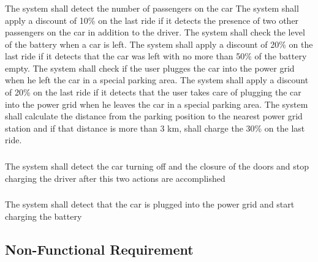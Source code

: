 \subsubsection{}
\begin{itemize}
	\reqcounter The system shall detect the number of passengers on the car
	\reqcounter The system shall apply a discount of 10\% on the last ride if it detects the presence of two other passengers on the car in addition to the driver.
	\reqcounter The system shall check the level of the battery when a car is left.
	\reqcounter The system shall apply a discount 	of 20\% on the last ride if it detects that the car was left with no more than 50\% of the battery empty.
	\reqcounter The system shall check if the user plugges the car into the power grid when he left the car in a special parking area.
	\reqcounter The system shall apply a discount 	of 20\% on the last ride if it detects that the user takes care of plugging the car into the power grid when he leaves the car in a special parking area. 
	\reqcounter The system shall calculate the distance from the parking position to the nearest power grid station and if that distance is more than 3 km, shall charge the 30\% on the last ride. 
		
\end{itemize}


\subsubsection{}
\begin{itemize}
	\reqcounter The system shall detect the car turning off and the closure of the doors and stop charging the driver after this two actions are accomplished
	
\end{itemize}


\subsubsection{}
\begin{itemize}
	\reqcounter The system shall detect that the car is plugged into the power grid and start charging the battery

\end{itemize}

\subsection{Non-Functional Requirement}



